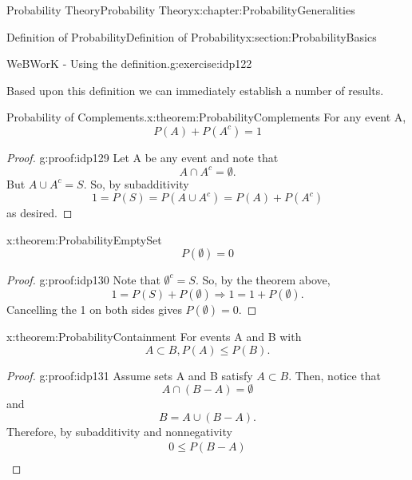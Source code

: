 \documentclass[oneside,10pt,]{book}
\numberwithin{equation}{section}
\begin{document}
\begin{chapterptx}{Probability Theory}{}{Probability Theory}{}{}{x:chapter:ProbabilityGeneralities}
\begin{sectionptx}{Definition of Probability}{}{Definition of Probability}{}{}{x:section:ProbabilityBasics}
\begin{inlineexercise}{WeBWorK - Using the definition.}{g:exercise:idp122}
\par
\end{inlineexercise}%
Based upon this definition we can immediately establish a number of results.%
\begin{theorem}{Probability of Complements.}{}{x:theorem:ProbabilityComplements}%
For any event A,%
\begin{equation*}
P(A) + P(A^c) = 1
\end{equation*}
%
\end{theorem}
\begin{proof}{}{g:proof:idp129}
Let A be any event and note that%
\begin{equation*}
A \cap A^c = \emptyset.
\end{equation*}
But \(A \cup A^c = S\). So, by subadditivity%
\begin{equation*}
1 = P(S) = P(A \cup A^c) = P(A) + P(A^c)
\end{equation*}
as desired.%
\end{proof}
\begin{theorem}{}{}{x:theorem:ProbabilityEmptySet}%
%
\begin{equation*}
P(\emptyset) = 0
\end{equation*}
%
\end{theorem}
\begin{proof}{}{g:proof:idp130}
Note that \(\emptyset^c = S\). So, by the theorem above,%
\begin{equation*}
1 = P(S) + P(\emptyset) \Rightarrow 1 = 1 + P(\emptyset).
\end{equation*}
Cancelling the 1 on both sides gives \(P(\emptyset) = 0\).%
\end{proof}
\begin{theorem}{}{}{x:theorem:ProbabilityContainment}%
For events A and B with%
\begin{equation*}
A \subset B, P(A) \le P(B)\text{.}
\end{equation*}
\end{theorem}
\begin{proof}{}{g:proof:idp131}
Assume sets A and B satisfy \(A \subset B\). Then, notice that%
\begin{equation*}
A \cap (B-A) = \emptyset
\end{equation*}
and%
\begin{equation*}
B = A \cup (B-A).
\end{equation*}
Therefore, by subadditivity and nonnegativity%
\begin{gather*}
0 \le P(B-A)\\

\end{gather*}
\end{proof}
\end{sectionptx}
\end{chapterptx}
\end{document}
